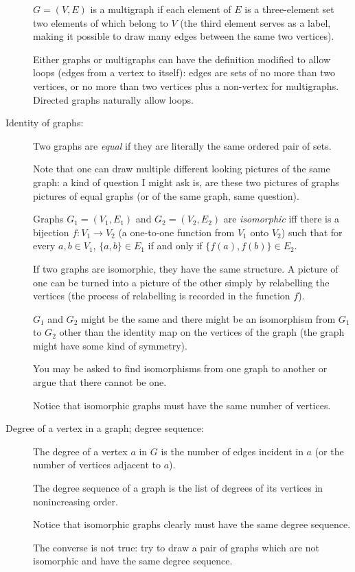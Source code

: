 \documentclass[12pt]{article}
\begin{document}
\begin{description}
$G=(V,E)$ is a multigraph if each element of $E$ is a three-element set two elements of which belong to $V$ (the third element serves as a label, making it possible to draw many edges between the same two vertices).

Either graphs or multigraphs can have the definition modified to allow loops (edges from a vertex to itself):  edges are sets of no more than two vertices, or no more than two vertices plus a non-vertex for multigraphs.  Directed graphs naturally allow loops.

\item[Identity of graphs:]  Two graphs are {\em equal\/} if they are literally the same ordered pair of sets.

Note that one can draw multiple different looking pictures of the same graph:  a kind of question I might ask is, are these two pictures of graphs pictures of equal graphs (or of the same graph, same question).

Graphs $G_1 = (V_1,E_1)$ and $G_2=(V_2,E_2)$ are {\em isomorphic\/} iff there is a bijection $f:V_1 \rightarrow V_2$ (a one-to-one function from $V_1$ onto $V_2$) such that for every $a,b \in V_1$, $\{a,b\} \in E_1$ if and only if $\{f(a),f(b)\} \in E_2$.

If two graphs are isomorphic, they have the same structure.  A picture of one can be turned into a picture of the other simply by relabelling the vertices (the process of relabelling is recorded in the function $f$).

$G_1$ and $G_2$ might be the same and there might be an isomorphism from $G_1$ to $G_2$ other than the identity map on the vertices of the graph (the graph might have some kind of symmetry).

You may be asked to find isomorphisms from one graph to another or argue that there cannot be one.

Notice that isomorphic graphs must have the same number of vertices.

\item[Degree of a vertex in a graph;  degree sequence:]  The degree of a vertex $a$ in $G$ is the number of edges incident in $a$ (or the number of vertices adjacent to $a$).

The degree sequence of a graph is the list of degrees of its vertices in nonincreasing order.

Notice that isomorphic graphs clearly must have the same degree sequence.

The converse is not true:  try to draw a pair of graphs which are not isomorphic and have the same degree sequence.


\end{description}
\end{document}
